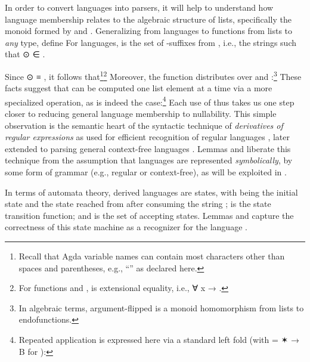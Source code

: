 \documentclass[acmsmall,screen,timestamp]{acmart}  %
\begin{document}
\rnc{}

In order to convert languages into parsers, it will help to understand how language membership relates to the algebraic structure of lists, specifically the monoid formed by  and \AIC{[]}.
Generalizing from languages to functions from lists to \emph{any} type, define
For languages, {  } is the set of -suffixes from , i.e., the strings  such that { \AF ⊙  \AF ∈ }.

Since { \AF ⊙ \AIC{[]} \AD ≡ }, it follows that\footnote{Recall that Agda variable names can contain most characters other than spaces and parentheses, e.g., ``'' as declared here.}\footnote{For functions  and , {  } is extensional equality, i.e., {\AS ∀ \AB x \AS →     }.}
Moreover, the function  distributes over \AIC{[]} and :\footnote{In algebraic terms, argument-flipped  is a monoid homomorphism from lists to endofunctions.}
These facts suggest that  can be computed one list element at a time via a more specialized operation, as is indeed the case:\footnote{Repeated  application is expressed here via a standard left fold (with { \AS =  \AF ✶ \AS → \AB B} for ):
\vspace{-5ex}
}
Each use of  thus takes us one step closer to reducing general language membership to nullability.
This simple observation is the semantic heart of the syntactic technique of \emph{derivatives of regular expressions} as used for efficient recognition of regular languages \citep{Brzozowski64}, later extended to parsing general context-free languages \citep{Might2010YaccID}.
Lemmas  and  liberate this technique from the assumption that languages are represented \emph{symbolically}, by some form of grammar (e.g., regular or context-free), as will be exploited in .

In terms of automata theory, derived languages are states, with  being the initial state and {  } the state reached from  after consuming the string ;  is the state transition function; and  is the set of accepting states\out{ \needcite{}}.
Lemmas  and  capture the correctness of this state machine as a recognizer for the language .
\end{document}
